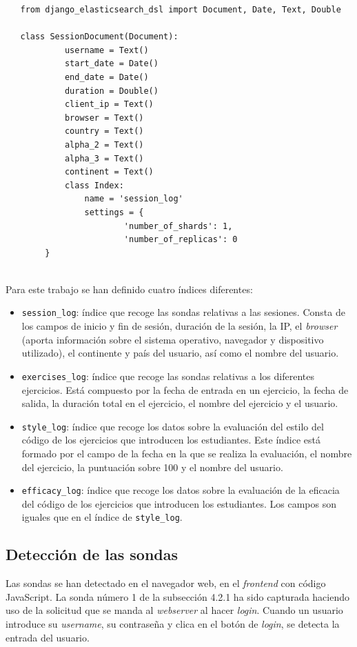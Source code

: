 \begin{lstlisting}
   from django_elasticsearch_dsl import Document, Date, Text, Double
   
   class SessionDocument(Document):
    		username = Text()
  	  		start_date = Date()
   			end_date = Date()
    		duration = Double()
    		client_ip = Text()
    		browser = Text()
    		country = Text()
    		alpha_2 = Text()
    		alpha_3 = Text()
    		continent = Text()
    		class Index:
        		name = 'session_log'
        		settings = {
            			'number_of_shards': 1,
           				'number_of_replicas': 0
        }
\end{lstlisting} 
\\
Para este trabajo se han definido cuatro índices diferentes:

\begin{itemize}
\item \texttt{session\_log}: índice que recoge las sondas relativas a las sesiones. Consta de los campos de inicio y fin de sesión, duración de la sesión, la IP, el \textit{browser} (aporta información sobre el sistema operativo, navegador y dispositivo utilizado), el continente y país del usuario, así como el nombre del usuario.
\item \texttt{exercises\_log}: índice que recoge las sondas relativas a los diferentes ejercicios. Está compuesto por la fecha de entrada en un ejercicio, la fecha de salida, la duración total en el ejercicio, el nombre del ejercicio y el usuario.
\newpage
\item \texttt{style\_log}: índice que recoge los datos sobre la evaluación del estilo del código de los ejercicios que introducen los estudiantes. Este índice está formado por el campo de la fecha en la que se realiza la evaluación, el nombre del ejercicio, la puntuación sobre 100 y el nombre del usuario.
\item \texttt{efficacy\_log}: índice que recoge los datos sobre la evaluación de la eficacia del código de los ejercicios que introducen los estudiantes. Los campos son iguales que en el índice de \texttt{style\_log}.
\end{itemize}
\subsection{Detección de las sondas}
Las sondas se han detectado en el navegador web, en el \textit{frontend} con código JavaScript. La sonda número 1 de la subsección 4.2.1 ha sido capturada haciendo uso de la solicitud que se manda al \textit{webserver }al hacer \textit{login}. Cuando un usuario introduce su \textit{username}, su contraseña y clica en el botón de \textit{login}, se detecta la entrada del usuario. \\

